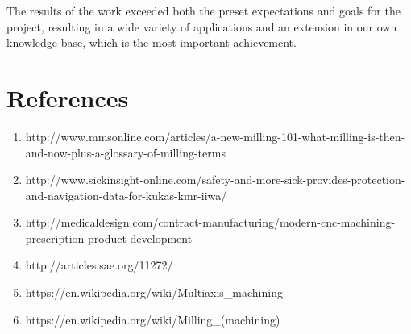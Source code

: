 	The results of the work exceeded both the preset expectations and goals for the project, resulting in a wide variety of applications and an extension in our own knowledge base, which is the most important achievement. 

	\section{References}
	\begin{enumerate}
		\item http://www.mmsonline.com/articles/a-new-milling-101-what-milling-is-then-and-now-plus-a-glossary-of-milling-terms
		\item http://www.sickinsight-online.com/safety-and-more-sick-provides-protection-and-navigation-data-for-kukas-kmr-iiwa/ 
		\item http://medicaldesign.com/contract-manufacturing/modern-cnc-machining-prescription-product-development 
		\item http://articles.sae.org/11272/ 
		\item https://en.wikipedia.org/wiki/Multiaxis\_machining 
		\item https://en.wikipedia.org/wiki/Milling\_(machining) 	
	\end{enumerate}
	

%